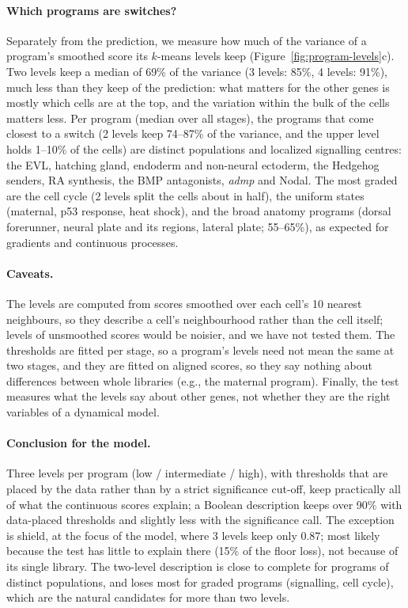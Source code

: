 \documentclass[11pt,a4paper]{article}
\begin{document}
\paragraph{Which programs are switches?} Separately from the prediction, we measure how much of the variance of a program's smoothed score its $k$-means levels keep (Figure~\ref{fig:program-levels}c). Two levels keep a median of 69\% of the variance (3 levels: 85\%, 4 levels: 91\%), much less than they keep of the prediction: what matters for the other genes is mostly which cells are at the top, and the variation within the bulk of the cells matters less. Per program (median over all stages), the programs that come closest to a switch (2 levels keep 74--87\% of the variance, and the upper level holds 1--10\% of the cells) are distinct populations and localized signalling centres: the EVL, hatching gland, endoderm and non-neural ectoderm, the Hedgehog senders, RA synthesis, the BMP antagonists, \emph{admp} and Nodal. The most graded are the cell cycle (2 levels split the cells about in half), the uniform states (maternal, p53 response, heat shock), and the broad anatomy programs (dorsal forerunner, neural plate and its regions, lateral plate; 55--65\%), as expected for gradients and continuous processes.

\paragraph{Caveats.} The levels are computed from scores smoothed over each cell's 10 nearest neighbours, so they describe a cell's neighbourhood rather than the cell itself; levels of unsmoothed scores would be noisier, and we have not tested them. The thresholds are fitted per stage, so a program's levels need not mean the same at two stages, and they are fitted on aligned scores, so they say nothing about differences between whole libraries (e.g., the maternal program). Finally, the test measures what the levels say about other genes, not whether they are the right variables of a dynamical model.

\paragraph{Conclusion for the model.} Three levels per program (low / intermediate / high), with thresholds that are placed by the data rather than by a strict significance cut-off, keep practically all of what the continuous scores explain; a Boolean description keeps over 90\% with data-placed thresholds and slightly less with the significance call. The exception is shield, at the focus of the model, where 3 levels keep only 0.87; most likely because the test has little to explain there (15\% of the floor loss), not because of its single library. The two-level description is close to complete for programs of distinct populations, and loses most for graded programs (signalling, cell cycle), which are the natural candidates for more than two levels.
\end{document}
